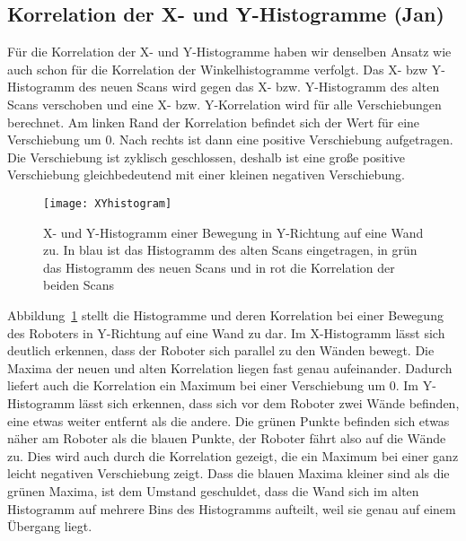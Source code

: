 \subsection{Korrelation der X- und Y-Histogramme (Jan)}

Für die Korrelation der X- und Y-Histogramme haben wir denselben Ansatz wie auch schon für die Korrelation der Winkelhistogramme verfolgt. Das X- bzw Y-Histogramm des neuen Scans wird gegen das X- bzw. Y-Histogramm des alten Scans verschoben und eine X- bzw. Y-Korrelation wird für alle Verschiebungen berechnet. Am linken Rand der Korrelation befindet sich der Wert für eine Verschiebung um 0. Nach rechts ist dann eine positive Verschiebung aufgetragen. Die Verschiebung ist zyklisch geschlossen, deshalb ist eine große positive Verschiebung gleichbedeutend mit einer kleinen negativen Verschiebung.

\begin{figure}
	\centering
	\texttt{[image: XYhistogram]}
	\caption{X- und Y-Histogramm einer Bewegung in Y-Richtung auf eine Wand zu. In blau ist das Histogramm des alten Scans eingetragen, in grün das Histogramm des neuen Scans und in rot die Korrelation der beiden Scans}
	\label{fig:xyhistogram}
\end{figure}

Abbildung~\ref{fig:xyhistogram} stellt die Histogramme und deren Korrelation bei einer Bewegung des Roboters in Y-Richtung auf eine Wand zu dar. Im X-Histogramm lässt sich deutlich erkennen, dass der Roboter sich parallel zu den Wänden bewegt. Die Maxima der neuen und alten Korrelation liegen fast genau aufeinander. Dadurch liefert auch die Korrelation ein Maximum bei einer Verschiebung um 0. Im Y-Histogramm lässt sich erkennen, dass sich vor dem Roboter zwei Wände befinden, eine etwas weiter entfernt als die andere. Die grünen Punkte befinden sich etwas näher am Roboter als die blauen Punkte, der Roboter fährt also auf die Wände zu. Dies wird auch durch die Korrelation gezeigt, die ein Maximum bei einer ganz leicht negativen Verschiebung zeigt. Dass die blauen Maxima kleiner sind als die grünen Maxima, ist dem Umstand geschuldet, dass die Wand sich im alten Histogramm auf mehrere Bins des Histogramms aufteilt, weil sie genau auf einem Übergang liegt.